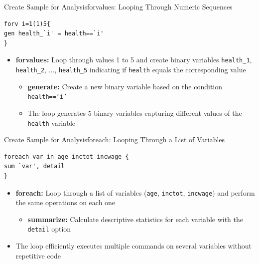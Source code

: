 \documentclass[dvipsnames,hyperref={pdfpagelabels=false}]{beamer}
\begin{document}
\begin{frame}[fragile]{Create Sample for Analysis}{forvalues: Looping Through Numeric Sequences}
	
		
\begin{lstlisting}
forv i=1(1)5{
gen health_`i' = health==`i'
}
\end{lstlisting}
		
		\vspace{0.2cm}
		
	\begin{itemize}
		\item \textbf{forvalues:} Loop through values 1 to 5 and create binary variables \texttt{health\_1}, \texttt{health\_2}, ..., \texttt{health\_5} indicating if \texttt{health} equals the corresponding value
		
		\vspace{0.2cm}
			\begin{itemize}
		
		\item \textbf{generate:} Create a new binary variable based on the condition \texttt{health==`i'} 
		
		\vspace{0.2cm}
		
		\item The loop generates 5 binary variables capturing different values of the \texttt{health} variable
			\end{itemize}
	\end{itemize}
	
\end{frame}



\begin{frame}[fragile]{Create Sample for Analysis}{foreach: Looping Through a List of Variables}
	
\begin{lstlisting}
foreach var in age inctot incwage {
sum `var', detail
}
\end{lstlisting}
		
		\vspace{0.2cm}
		
\begin{itemize}		
		\item \textbf{foreach:} Loop through a list of variables (\texttt{age}, \texttt{inctot}, \texttt{incwage}) and perform the same operations on each one
		
		\vspace{0.2cm}
		\begin{itemize}		
		\item \textbf{summarize:} Calculate descriptive statistics for each variable with the \texttt{detail} option
		
		\vspace{0.2cm}
			\end{itemize}
		\item The loop efficiently executes multiple commands on several variables without repetitive code
		
	\end{itemize}
	
\end{frame}
\end{document}
